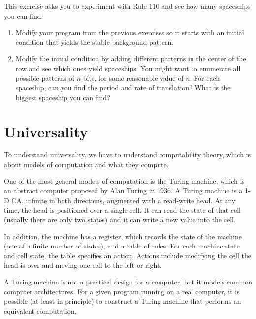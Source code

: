 \documentclass[10pt]{book}
\begin{document}
\begin{exercise}

This exercise asks you to experiment with Rule 110 and see how
many spaceships you can find.

\begin{enumerate}

\item Modify your program from the previous exercises so it starts
  with an initial condition that yields the stable background
  pattern.

\item Modify the initial condition by adding different patterns in the
  center of the row and see which ones yield spaceships.  You might
  want to enumerate all possible patterns of $n$ bits, for some
  reasonable value of $n$.  For each spaceship, can you find the
  period and rate of translation?  What is the biggest spaceship you
  can find?

\end{enumerate}

\end{exercise}


\section{Universality}

To understand universality, we have to understand computability
theory, which is about models of computation and what they compute.

One of the most general models of computation is the Turing machine,
which is an abstract computer proposed by Alan Turing in 1936.  A
Turing machine is a 1-D CA, infinite in both directions, augmented
with a read-write head.  At any time, the head is positioned over a
single cell.  It can read the state of that cell (usually there are
only two states) and it can write a new value into the cell.

In addition, the machine has a register, which records the state
of the machine (one of a finite number of states), and a table
of rules.  For each machine state and cell state, the table
specifies an action.  Actions include modifying the cell
the head is over and moving one cell to the left or right.

A Turing machine is not a practical design for a computer, but it
models common computer architectures.  For a given program running on
a real computer, it is possible (at least in principle) to construct a
Turing machine that performs an equivalent computation.
\end{document}
